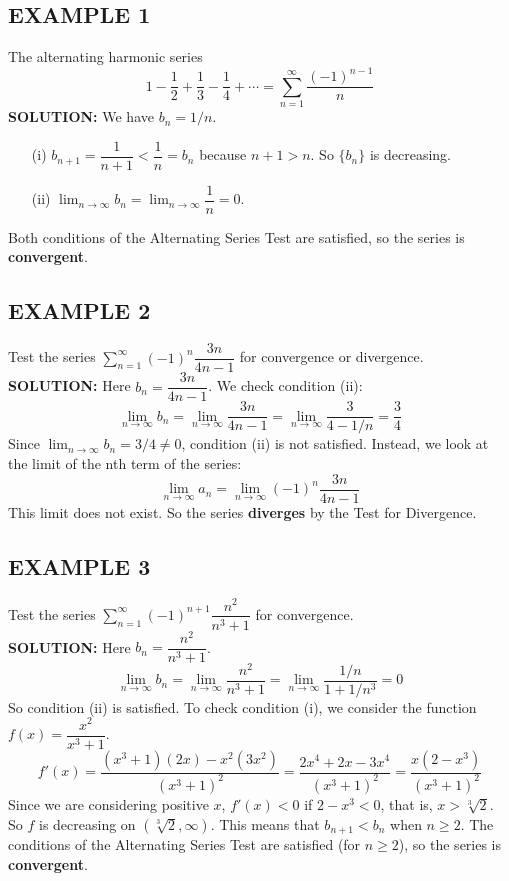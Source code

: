 \documentclass{article}
\theoremstyle{mystyle}
\begin{document}
\subsection*{EXAMPLE 1}
The alternating harmonic series
\[ 1 - \frac{1}{2} + \frac{1}{3} - \frac{1}{4} + \cdots = \sum_{n=1}^{\infty} \frac{(-1)^{n-1}}{n} \]
\textbf{SOLUTION:}
We have \(b_n = 1/n\).
\begin{itemize}
    \item[(i)] \(b_{n+1} = \dfrac{1}{n+1} < \dfrac{1}{n} = b_n\) because \(n+1 > n\). So \(\{b_n\}\) is decreasing.
    \item[(ii)] \( \lim_{n\to\infty} b_n = \lim_{n\to\infty} \dfrac{1}{n} = 0 \).
\end{itemize}
Both conditions of the Alternating Series Test are satisfied, so the series is \textbf{convergent}.

\subsection*{EXAMPLE 2}
Test the series \( \sum_{n=1}^{\infty} (-1)^n \dfrac{3n}{4n-1} \) for convergence or divergence.\\
\textbf{SOLUTION:}
Here \(b_n = \dfrac{3n}{4n-1}\). We check condition (ii):
\[ \lim_{n\to\infty} b_n = \lim_{n\to\infty} \dfrac{3n}{4n-1} = \lim_{n\to\infty} \dfrac{3}{4 - 1/n} = \dfrac{3}{4} \]
Since \( \lim_{n\to\infty} b_n = 3/4 \neq 0 \), condition (ii) is not satisfied. Instead, we look at the limit of the nth term of the series:
\[ \lim_{n\to\infty} a_n = \lim_{n\to\infty} (-1)^n \dfrac{3n}{4n-1} \]
This limit does not exist. So the series \textbf{diverges} by the Test for Divergence.

\subsection*{EXAMPLE 3}
Test the series \( \sum_{n=1}^{\infty} (-1)^{n+1} \dfrac{n^2}{n^3+1} \) for convergence.\\
\textbf{SOLUTION:}
Here \(b_n = \dfrac{n^2}{n^3+1}\).
\[ \lim_{n\to\infty} b_n = \lim_{n\to\infty} \dfrac{n^2}{n^3+1} = \lim_{n\to\infty} \dfrac{1/n}{1+1/n^3} = 0 \]
So condition (ii) is satisfied. To check condition (i), we consider the function \(f(x) = \dfrac{x^2}{x^3+1}\).
\[ f'(x) = \dfrac{(x^3+1)(2x) - x^2(3x^2)}{(x^3+1)^2} = \dfrac{2x^4+2x-3x^4}{(x^3+1)^2} = \dfrac{x(2-x^3)}{(x^3+1)^2} \]
Since we are considering positive \(x\), \(f'(x) < 0\) if \(2-x^3 < 0\), that is, \(x > \sqrt[3]{2}\).
So \(f\) is decreasing on \((\sqrt[3]{2}, \infty)\). This means that \(b_{n+1} < b_n\) when \(n \ge 2\). The conditions of the Alternating Series Test are satisfied (for \(n \ge 2\)), so the series is \textbf{convergent}.
\end{document}
